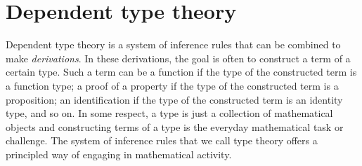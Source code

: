 \section{Dependent type theory}
\label{ch:dtt}

Dependent type theory is a system of inference rules that can be combined to make \emph{derivations}. In these derivations, the goal is often to construct a term of a certain type. Such a term can be a function if the type of the constructed term is a function type; a proof of a property if the type of the constructed term is a proposition; an identification if the type of the constructed term is an identity type, and so on. In some respect, a type is just a collection of mathematical objects and constructing terms of a type is the everyday mathematical task or challenge. The system of inference rules that we call type theory offers a principled way of engaging in mathematical activity.

